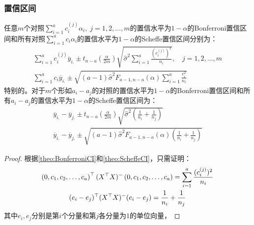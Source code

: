 \subsubsection{置信区间}
\begin{theorem}
	任意$m$个对照$\sum\limits_{i=1}^{a}c_i^{(j)}\alpha_i,\;j=1,2,\dots,m$的置信水平为$1-\alpha$的Bonferroni置信区间和所有对照$\sum\limits_{i=1}^{a}c_i\alpha_i$的置信水平为$1-\alpha$的Scheffe置信区间分别为：
	\begin{gather*}
		\sum_{i=1}^{a}c_i^{(j)}\overline{y}_{i.}\pm t_{n-a}\left(\frac{\alpha}{2m}\right)\sqrt{\hat{\sigma}^2\sum_{i=1}^{a}\frac{(c_i^{(j)})^2}{n_i}},\quad j=1,2,\dots,m \\
		\sum_{i=1}^{a}c_i\overline{y}_{i.}\pm\sqrt{(a-1)\hat{\sigma}^2F_{a-1,n-a}(\alpha)\sum_{i=1}^{a}\frac{c_i^2}{n_i}}
	\end{gather*}
	特别的。对于$m$个形如$a_i-a_j$的对照的置信水平为$1-\alpha$的Bonferroni置信区间和所有$a_i-a_j$的置信水平为$1-\alpha$的Scheffe置信区间为：
	\begin{gather*}
		\overline{y}_{i.}-\overline{y}_{j.}\pm t_{n-a}\left(\frac{\alpha}{2m}\right)\sqrt{\hat{\sigma}^2\left(\frac{1}{n_i}+\frac{1}{n_j}\right)} \\
		\overline{y}_{i.}-\overline{y}_{j.}\pm\sqrt{(a-1)\hat{\sigma}^2F_{a-1,n-a}(\alpha)\left(\frac{1}{n_i}+\frac{1}{n_j}\right)}
	\end{gather*}
\end{theorem}
\begin{proof}
	根据\cref{theo:BonferroniCI}和\cref{theo:ScheffeCI}，只需证明：
	\begin{gather*}
		\left(0,c_1, c_2, \dots, c_{a}\right)^{\top}(X^{\top}X)^-\left(0,c_1, c_2, \dots, c_{a}\right)=\sum_{i=1}^{a}\frac{(c_i^{(j)})^2}{n_i} \\
		(e_i-e_j)^{\top}(X^{\top}X)^-(e_i-e_j)=\frac{1}{n_i}+\frac{1}{n_j}
	\end{gather*}
	其中$e_i,e_j$分别是第$i$个分量和第$j$各分量为$1$的单位向量，
\end{proof}

